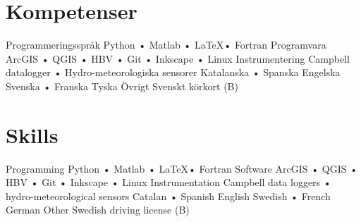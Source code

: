\ifswedish
  \section{Kompetenser}
    \skill
      {Programmeringsspråk}
      {Python • Matlab • \LaTeX • Fortran}
    \skill
      {Programvara}
      {ArcGIS • QGIS • HBV • Git • Inkscape • Linux}
    \skill
      {Instrumentering}
      {Campbell datalogger • Hydro-meteorologiska sensorer}
    \languages
      {Katalanska • Spanska}
      {Engelska}
      {Svenska • Franska}
      {Tyska}
    \skill
      {Övrigt}
      {Svenskt körkort (B)}
\else
  \section{Skills}
    \skill
      {Programming}
      {Python • Matlab • \LaTeX • Fortran}
    \skill
      {Software}
      {ArcGIS • QGIS • HBV • Git • Inkscape • Linux}
    \skill
      {Instrumentation}
      {Campbell data loggers • hydro-meteorological sensors}
    \languages
      {Catalan • Spanish}
      {English}
      {Swedish • French}
      {German}
    \skill
      {Other}
      {Swedish driving license (B)}
\fi
